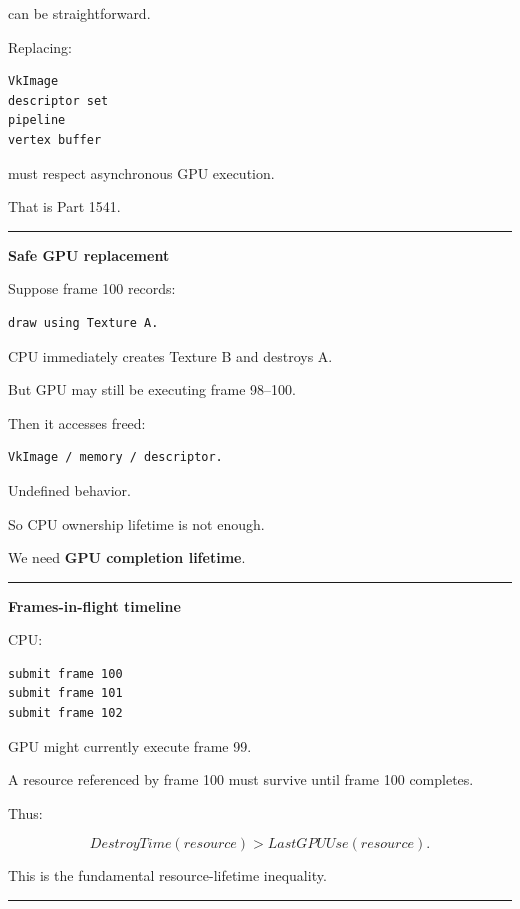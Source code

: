 can be straightforward.

Replacing:

\begin{verbatim}
VkImage
descriptor set
pipeline
vertex buffer
\end{verbatim}

must respect asynchronous GPU execution.

That is Part 1541.

\begin{center}\rule{0.5\linewidth}{0.5pt}\end{center}

\textbf{Safe GPU replacement}

Suppose frame 100 records:

\begin{verbatim}
draw using Texture A.
\end{verbatim}

CPU immediately creates Texture B and destroys A.

But GPU may still be executing frame 98--100.

Then it accesses freed:

\begin{verbatim}
VkImage / memory / descriptor.
\end{verbatim}

Undefined behavior.

So CPU ownership lifetime is not enough.

We need \textbf{GPU completion lifetime}.

\begin{center}\rule{0.5\linewidth}{0.5pt}\end{center}

\textbf{Frames-in-flight timeline}

CPU:

\begin{verbatim}
submit frame 100
submit frame 101
submit frame 102
\end{verbatim}

GPU might currently execute frame 99.

A resource referenced by frame 100 must survive until frame 100 completes.

Thus:

\[
DestroyTime(resource)
>
LastGPUUse(resource).
\]

This is the fundamental resource-lifetime inequality.

\begin{center}\rule{0.5\linewidth}{0.5pt}\end{center}

